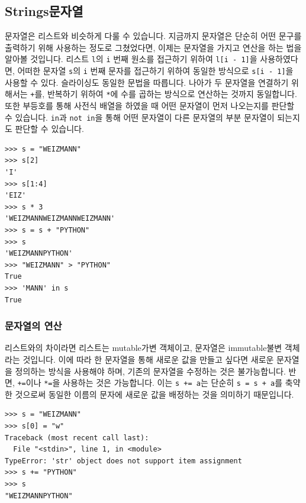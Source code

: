 \documentclass[../main.tex]{subfiles}
\begin{document}
\subsection{Strings문자열}
문자열은 리스트와 비슷하게 다룰 수 있습니다.
지금까지 문자열은 단순히 어떤 문구를 출력하기 위해 사용하는 정도로 그쳤었다면, 이제는 문자열을 가지고 연산을 하는 법을 알아볼 것입니다.
리스트 \texttt{l}의 \texttt{i} 번째 원소를 접근하기 위하여 \texttt{l[i - 1]}을 사용하였다면, 어떠한 문자열 \texttt{s}의 \texttt{i} 번째 문자를 접근하기 위하여 동일한 방식으로 \texttt{s[i - 1]}을 사용할 수 있다.
슬라이싱도 동일한 문법을 따릅니다.
나아가 두 문자열을 연결하기 위해서는 \texttt{+}를, 반복하기 위하여 \texttt{*}에 수를 곱하는 방식으로 연산하는 것까지 동일합니다.
또한 부등호를 통해 사전식 배열을 하였을 때 어떤 문자열이 먼저 나오는지를 판단할 수 있습니다.
\texttt{in}과 \texttt{not in}을 통해 어떤 문자열이 다른 문자열의 부분 문자열이 되는지도 판단할 수 있습니다.
\begin{verbatim}
>>> s = "WEIZMANN"
>>> s[2]
'I'
>>> s[1:4]
'EIZ'
>>> s * 3
'WEIZMANNWEIZMANNWEIZMANN'
>>> s = s + "PYTHON"
>>> s
'WEIZMANNPYTHON'
>>> "WEIZMANN" > "PYTHON"
True
>>> 'MANN' in s
True
\end{verbatim}

\subsubsection{문자열의 연산}
리스트와의 차이라면 리스트는 mutable가변 객체이고, 문자열은 immutable불변 객체라는 것입니다.
이에 따라 한 문자열을 통해 새로운 값을 만들고 싶다면 새로운 문자열을 정의하는 방식을 사용해야 하며, 기존의 문자열을 수정하는 것은 불가능합니다.
반면, \texttt{+=}이나 \texttt{*=}을 사용하는 것은 가능합니다.
이는 \texttt{s += \textquotesingle a\textquotesingle}는 단순히 \texttt{s = s + \textquotesingle a\textquotesingle}를 축약한 것으로써 동일한 이름의 문자에 새로운 값을 배정하는 것을 의미하기 때문입니다.
\begin{verbatim}
>>> s = "WEIZMANN"
>>> s[0] = "w"
Traceback (most recent call last):
  File "<stdin>", line 1, in <module>
TypeError: 'str' object does not support item assignment
>>> s += "PYTHON"
>>> s
"WEIZMANNPYTHON"
\end{verbatim}
\end{document}
